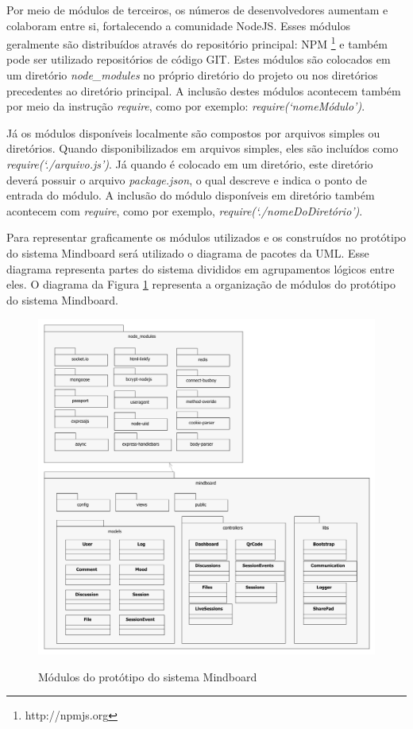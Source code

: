 Por meio de módulos de terceiros, os números de desenvolvedores aumentam e colaboram entre si, fortalecendo a comunidade NodeJS. Esses módulos geralmente são distribuídos através do repositório principal: NPM \footnote{http://npmjs.org} e também pode ser utilizado repositórios de código GIT. Estes módulos são colocados em um diretório \emph{node\_modules} no próprio diretório do projeto ou nos diretórios precedentes ao diretório principal. A inclusão destes módulos acontecem também por meio da instrução \emph{require}, como por exemplo: \emph{require(`nomeMódulo')}.

Já os módulos disponíveis localmente são compostos por arquivos simples ou diretórios. Quando disponibilizados em arquivos simples, eles são incluídos como \emph{require(`./arquivo.js')}. Já quando é colocado em um diretório, este diretório deverá possuir o arquivo \emph{package.json}, o qual descreve e indica o ponto de entrada do módulo. A inclusão do módulo disponíveis em diretório também acontecem com \emph{require}, como por exemplo, \emph{require(`./nomeDoDiretório')}.

Para representar graficamente os módulos utilizados e os construídos no protótipo do sistema Mindboard será utilizado o diagrama de pacotes da UML. Esse diagrama representa partes do sistema divididos em agrupamentos lógicos entre eles. O diagrama da Figura \ref{fig:modulos} representa a organização de módulos do protótipo do sistema Mindboard.


\begin{figure}[h]
\centering
\caption{Módulos do protótipo do sistema Mindboard}
\includegraphics[width=1.0\textwidth]{pdfs/modulos.pdf} 
\label{fig:modulos} 
\end{figure}

